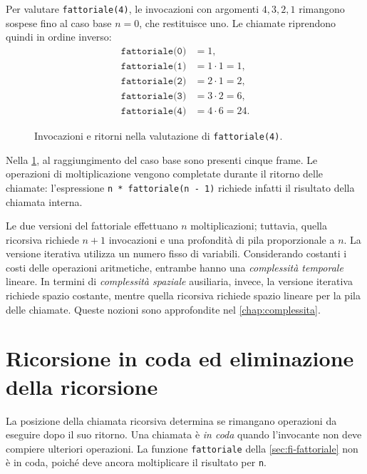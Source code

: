 \begin{example}
\label{ex:fi-traccia-fattoriale}
Per valutare \texttt{fattoriale(4)}, le invocazioni con argomenti
\(4,3,2,1\) rimangono sospese fino al caso base \(n=0\), che restituisce
uno. Le chiamate riprendono quindi in ordine inverso:
\[
\begin{aligned}
  \texttt{fattoriale(0)}&=1,\\
  \texttt{fattoriale(1)}&=1\cdot1=1,\\
  \texttt{fattoriale(2)}&=2\cdot1=2,\\
  \texttt{fattoriale(3)}&=3\cdot2=6,\\
  \texttt{fattoriale(4)}&=4\cdot6=24.
\end{aligned}
\]
\end{example}

\begin{figure}[htbp]
  \centering
  
  \caption{Invocazioni e ritorni nella valutazione di
  \texttt{fattoriale(4)}.}
  \label{fig:fi-fattoriale-chiamate}
\end{figure}

Nella \cref{fig:fi-fattoriale-chiamate}, al raggiungimento del caso base
sono presenti cinque frame. Le operazioni di moltiplicazione vengono
completate durante il ritorno delle chiamate: l'espressione
\texttt{n * fattoriale(n - 1)} richiede infatti il risultato della
chiamata interna.

\clearpage

Le due versioni del fattoriale effettuano \(n\) moltiplicazioni;
tuttavia, quella ricorsiva richiede \(n+1\) invocazioni e una
profondità di pila proporzionale a \(n\). La versione iterativa
utilizza un numero fisso di variabili. Considerando costanti i costi
delle operazioni aritmetiche, entrambe hanno una \emph{complessità
temporale} lineare. In termini di \emph{complessità spaziale}
ausiliaria, invece, la versione iterativa richiede spazio costante,
mentre quella ricorsiva richiede spazio lineare per la pila delle
chiamate. Queste nozioni sono approfondite nel \cref{chap:complessita}.

\section{Ricorsione in coda ed eliminazione della ricorsione}
\label{sec:fi-ricorsione-coda}

La posizione della chiamata ricorsiva determina se rimangano
operazioni da eseguire dopo il suo ritorno. Una chiamata è \emph{in coda}
quando l'invocante non deve compiere ulteriori operazioni. La funzione
\texttt{fattoriale} della \cref{sec:fi-fattoriale} non è in coda,
poiché deve ancora moltiplicare il risultato per \texttt{n}.

